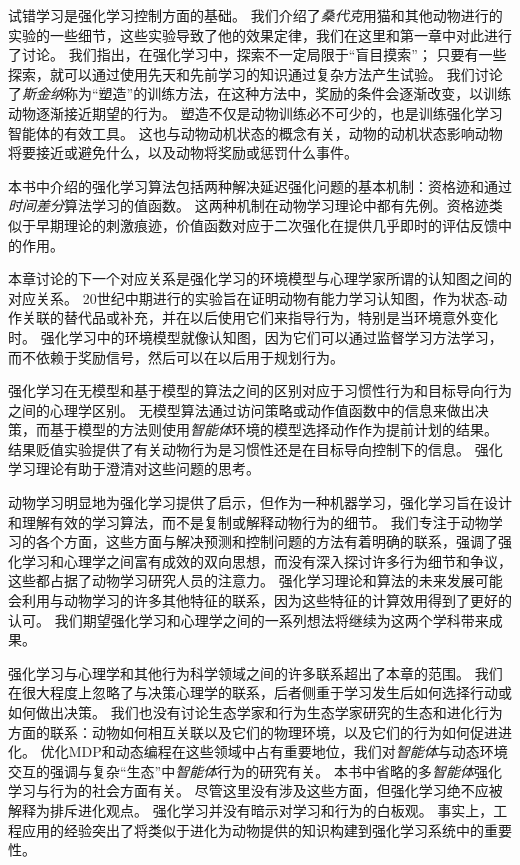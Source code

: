 试错学习是强化学习控制方面的基础。
我们介绍了\textit{桑代克}用猫和其他动物进行的实验的一些细节，这些实验导致了他的效果定律，我们在这里和第一章中对此进行了讨论。
我们指出，在强化学习中，探索不一定局限于“盲目摸索”；
只要有一些探索，就可以通过使用先天和先前学习的知识通过复杂方法产生试验。
我们讨论了\textit{斯金纳}称为“塑造”的训练方法，在这种方法中，奖励的条件会逐渐改变，以训练动物逐渐接近期望的行为。
塑造不仅是动物训练必不可少的，也是训练强化学习智能体的有效工具。
这也与动物动机状态的概念有关，动物的动机状态影响动物将要接近或避免什么，以及动物将奖励或惩罚什么事件。


本书中介绍的强化学习算法包括两种解决延迟强化问题的基本机制：资格迹和通过\textit{时间差分}算法学习的值函数。
这两种机制在动物学习理论中都有先例。资格迹类似于早期理论的刺激痕迹，价值函数对应于二次强化在提供几乎即时的评估反馈中的作用。


本章讨论的下一个对应关系是强化学习的环境模型与心理学家所谓的认知图之间的对应关系。
20世纪中期进行的实验旨在证明动物有能力学习认知图，作为状态-动作关联的替代品或补充，并在以后使用它们来指导行为，特别是当环境意外变化时。
强化学习中的环境模型就像认知图，因为它们可以通过监督学习方法学习，而不依赖于奖励信号，然后可以在以后用于规划行为。


强化学习在无模型和基于模型的算法之间的区别对应于习惯性行为和目标导向行为之间的心理学区别。
无模型算法通过访问策略或动作值函数中的信息来做出决策，而基于模型的方法则使用\textit{智能体}环境的模型选择动作作为提前计划的结果。
结果贬值实验提供了有关动物行为是习惯性还是在目标导向控制下的信息。
强化学习理论有助于澄清对这些问题的思考。


动物学习明显地为强化学习提供了启示，但作为一种机器学习，强化学习旨在设计和理解有效的学习算法，而不是复制或解释动物行为的细节。
我们专注于动物学习的各个方面，这些方面与解决预测和控制问题的方法有着明确的联系，强调了强化学习和心理学之间富有成效的双向思想，而没有深入探讨许多行为细节和争议，这些都占据了动物学习研究人员的注意力。
强化学习理论和算法的未来发展可能会利用与动物学习的许多其他特征的联系，因为这些特征的计算效用得到了更好的认可。
我们期望强化学习和心理学之间的一系列想法将继续为这两个学科带来成果。


强化学习与心理学和其他行为科学领域之间的许多联系超出了本章的范围。
我们在很大程度上忽略了与决策心理学的联系，后者侧重于学习发生后如何选择行动或如何做出决策。
我们也没有讨论生态学家和行为生态学家研究的生态和进化行为方面的联系：动物如何相互关联以及它们的物理环境，以及它们的行为如何促进进化。
优化MDP和动态编程在这些领域中占有重要地位，我们对\textit{智能体}与动态环境交互的强调与复杂“生态”中\textit{智能体}行为的研究有关。
本书中省略的多\textit{智能体}强化学习与行为的社会方面有关。
尽管这里没有涉及这些方面，但强化学习绝不应被解释为排斥进化观点。
强化学习并没有暗示对学习和行为的白板观。
事实上，工程应用的经验突出了将类似于进化为动物提供的知识构建到强化学习系统中的重要性。





